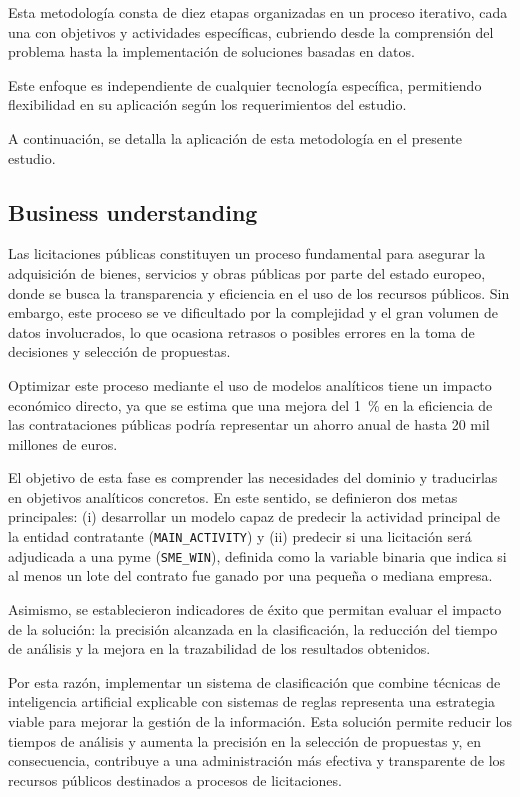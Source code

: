 \documentclass[a4paper,fleqn]{cas-sc}
\begin{document}
Esta metodología consta de diez etapas organizadas en un proceso iterativo, cada una con objetivos y actividades específicas, cubriendo desde la comprensión del problema hasta la implementación de soluciones basadas en datos.

Este enfoque es independiente de cualquier tecnología específica, permitiendo flexibilidad en su aplicación según los requerimientos del estudio. 	
	
	
 	\par	A continuación, se detalla la aplicación de esta metodología en el presente estudio.
 
 \subsection{Business understanding}\label{sec:fase1}
 
 Las licitaciones públicas constituyen un proceso fundamental para asegurar la adquisición de bienes, servicios y obras públicas por parte del estado europeo, donde se busca la transparencia y eficiencia en el uso de los recursos públicos. Sin embargo, este proceso se ve dificultado por la complejidad y el gran volumen de datos involucrados, lo que ocasiona retrasos o posibles errores en la toma de decisiones y selección de propuestas. 

 	Optimizar este proceso mediante el uso de modelos analíticos tiene un impacto económico directo, ya que se estima que una mejora del 1~\% en la eficiencia de las contrataciones públicas podría representar un ahorro anual de hasta 20 mil millones de euros.

	El objetivo de esta fase es comprender las necesidades del dominio y traducirlas en objetivos analíticos concretos. En este sentido, se definieron dos metas principales: (i) desarrollar un modelo capaz de predecir la actividad principal de la entidad contratante (\texttt{MAIN\_ACTIVITY}) y (ii) predecir si una licitación será adjudicada a una pyme (\texttt{SME\_WIN}), definida como la variable binaria que indica si al menos un lote del contrato fue ganado por una pequeña o mediana empresa.

	Asimismo, se establecieron indicadores de éxito que permitan evaluar el impacto de la solución: la precisión alcanzada en la clasificación, la reducción del tiempo de análisis y la mejora en la trazabilidad de los resultados obtenidos.

Por esta razón, implementar un sistema de clasificación  
 que combine técnicas de inteligencia artificial explicable  con sistemas de reglas  representa una estrategia viable  para 
 mejorar la gestión de la información. Esta solución permite reducir los tiempos de análisis y aumenta la precisión en la selección de propuestas y, en consecuencia, contribuye a una administración más efectiva y transparente de los recursos públicos destinados a procesos de licitaciones.
\end{document}
